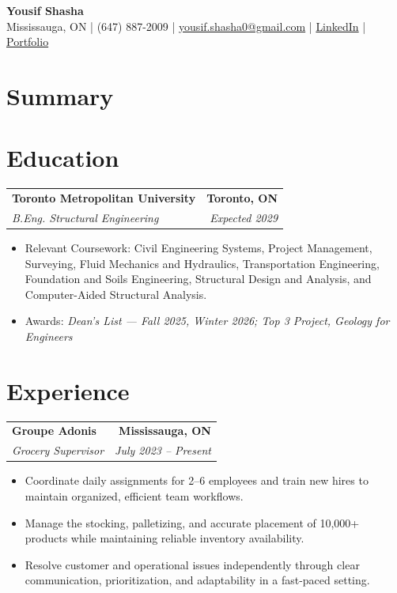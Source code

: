 \documentclass[11pt]{article}
\newcommand{\contact}[1]{\small #1}
\newcommand{\entry}[4]{%
  \begin{tabularx}{\textwidth}{X r}
    \textbf{#1} & \textbf{#2} \\
    \textit{#3} & \textit{#4} \\
  \end{tabularx}\vspace{-2pt}
}
\newcommand{\tightItem}[1]{\item \fontsize{10}{10.2}\selectfont #1}
\begin{document}
\begin{center}
{\LARGE \textbf{Yousif Shasha}}\\[4pt]
\contact{Mississauga, ON \;\;|\;\; (647) 887-2009 \;\;|\;\;
\href{mailto:yousif.shasha0@gmail.com}{yousif.shasha0@gmail.com} \;\;|\;\;
\href{https://www.linkedin.com/in/yousif-shasha-177412375}{LinkedIn}}
\;\;|\;\;
\href{https://yousifshasha.github.io/Yousif-Shasha.github.io/}{Portfolio}
\end{center}

\vspace{-4pt}

\section*{Summary}
\fontsize{10}{10.2}\selectfont{
Structural Engineering student seeking a Winter 2027 civil infrastructure and utilities co-op. Experienced in AutoCAD drafting, hydraulic network modelling, surveying, engineering data analysis, and technical documentation through academic and team projects. Brings strong organization, attention to detail, and collaborative leadership developed in engineering fieldwork and a fast-paced supervisory role.}

\section*{Education}
\entry
{Toronto Metropolitan University}{Toronto, ON}
{B.Eng. Structural Engineering}{Expected 2029}
\begin{itemize}
  \tightItem{Relevant Coursework: Civil Engineering Systems, Project Management, Surveying, Fluid Mechanics and Hydraulics, Transportation Engineering, Foundation and Soils Engineering, Structural Design and Analysis, and Computer-Aided Structural Analysis.}
  \tightItem{Awards: \textit{Dean's List --- Fall 2025, Winter 2026; Top 3 Project, Geology for Engineers}}
\end{itemize}
\vspace{2pt}

\section*{Experience}
\entry
{Groupe Adonis}{Mississauga, ON}
{Grocery Supervisor}{July 2023 -- Present}
\begin{itemize}
  \tightItem{Coordinate daily assignments for 2--6 employees and train new hires to maintain organized, efficient team workflows.}
  \tightItem{Manage the stocking, palletizing, and accurate placement of 10,000+ products while maintaining reliable inventory availability.}
  \tightItem{Resolve customer and operational issues independently through clear communication, prioritization, and adaptability in a fast-paced setting.}
\end{itemize}
\end{document}
